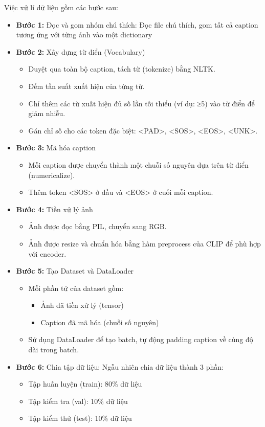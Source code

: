 \documentclass[../main.tex]{subfiles}
\begin{document}
Việc xử lí dữ liệu gồm các bước sau:
\begin{itemize}
    \item \textbf{Bước 1: } Đọc và gom nhóm chú thích: Đọc file chú thích, gom tất cả caption tương ứng với từng ảnh vào một dictionary
    \item \textbf{Bước 2: } Xây dựng từ điển (Vocabulary)
    \begin{itemize}
        \item Duyệt qua toàn bộ caption, tách từ (tokenize) bằng NLTK.
        \item Đếm tần suất xuất hiện của từng từ.
        \item Chỉ thêm các từ xuất hiện đủ số lần tối thiểu (ví dụ: ≥5) vào từ điển để giảm nhiễu.
        \item Gán chỉ số cho các token đặc biệt: <PAD>, <SOS>, <EOS>, <UNK>.
    \end{itemize}
    \item \textbf{Bước 3: } Mã hóa caption
    \begin{itemize}
        \item Mỗi caption được chuyển thành một chuỗi số nguyên dựa trên từ điển (numericalize).
        \item Thêm token <SOS> ở đầu và <EOS> ở cuối mỗi caption.
    \end{itemize}
    \item \textbf{Bước 4: } Tiền xử lý ảnh
    \begin{itemize}
        \item Ảnh được đọc bằng PIL, chuyển sang RGB.
        \item Ảnh được resize và chuẩn hóa bằng hàm preprocess của CLIP để phù hợp với encoder.
    \end{itemize}
    \item \textbf{Bước 5: } Tạo Dataset và DataLoader
    \begin{itemize}
        \item Mỗi phần tử của dataset gồm:
        \begin{itemize}
            \item Ảnh đã tiền xử lý (tensor)
            \item Caption đã mã hóa (chuỗi số nguyên)
        \end{itemize}
        \item Sử dụng DataLoader để tạo batch, tự động padding caption về cùng độ dài trong batch.
    \end{itemize}
    \item \textbf{Bước 6: } Chia tập dữ liệu: Ngẫu nhiên chia dữ liệu thành 3 phần:
    \begin{itemize}
        \item Tập huấn luyện (train): 80\% dữ liệu
        \item Tập kiểm tra (val): 10\% dữ liệu
        \item Tập kiểm thử (test): 10\% dữ liệu
    \end{itemize}
\end{itemize}
\end{document}
